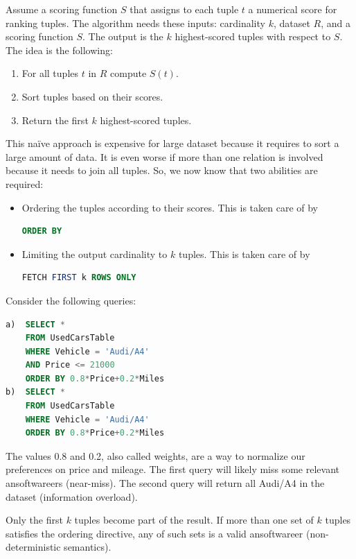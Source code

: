 \documentclass[12pt, a4paper]{report}
\newtheorem[style=M,bodystyle=\normalfont]{theorem}{Theorem}
\newtheorem[style=M,bodystyle=\normalfont]{corollary}{Corollary}
\newtheorem[style=M,bodystyle=\normalfont]{lemma}{Lemma}
\newtheorem[style=M,bodystyle=\normalfont]{definition}{Definition}
\begin{document}
    Assume a scoring function $S$ that assigns to each tuple $t$ a numerical score for ranking tuples. The algorithm needs these inputs: cardinality $k$, dataset $R$, and a scoring function $S$. The output is 
    the $k$ highest-scored tuples with respect to $S$. The idea is the following: 
    \begin{enumerate}
        \item For all tuples $t$ in $R$ compute $S(t)$. 
        \item Sort tuples based on their scores.
        \item Return the first $k$ highest-scored tuples. 
    \end{enumerate}
    This naïve approach is expensive for large dataset because it requires to sort a large amount of data. It is even worse if more than one relation is involved because it needs to join all tuples. So, 
    we now know that two abilities are required: 
    \begin{itemize}
        \item Ordering the tuples according to their scores. This is taken care of by 
            \begin{lstlisting}[language=SQL]
ORDER BY
            \end{lstlisting}
        \item Limiting the output cardinality to $k$ tuples. This is taken care of by 
            \begin{lstlisting}[language=SQL]
FETCH FIRST k ROWS ONLY
            \end{lstlisting}
    \end{itemize} 
    \begin{example}
        Consider the following queries: 
        \begin{lstlisting}[language=SQL]
a)  SELECT *
    FROM UsedCarsTable
    WHERE Vehicle = 'Audi/A4'
    AND Price <= 21000
    ORDER BY 0.8*Price+0.2*Miles
b)  SELECT *
    FROM UsedCarsTable
    WHERE Vehicle = 'Audi/A4'
    ORDER BY 0.8*Price+0.2*Miles
        \end{lstlisting}
        The values 0.8 and 0.2, also called weights, are a way to normalize our preferences on price and mileage.
        The first query will likely miss some relevant ansoftwareers (near-miss). The second query will return all Audi/A4 in the dataset (information overload).
    \end{example}
    Only the first $k$ tuples become part of the result. If more than one set of $k$ tuples satisfies the ordering directive, any of such sets is a valid ansoftwareer 
    (non-deterministic semantics). 
\end{document}
